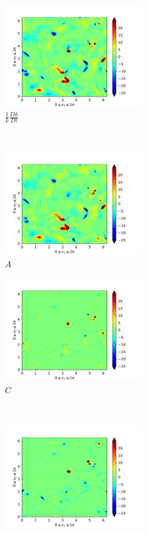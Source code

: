 \begin{figure}[H]
    \begin{subfigure}[H]{0.45\textwidth}
        \includegraphics[height=1.75in]{media/run-cds-65/ke-1360}
        \caption{$\frac{1}{k} \frac{D k}{Dt}$}
    \end{subfigure}
    ~
    \begin{subfigure}{0.45\textwidth}
        \includegraphics[height=1.75in]{media/run-cds-65/A-ke-1360}
        \caption{$A$}
    \end{subfigure}
    \newline
    \begin{subfigure}{0.45\textwidth}
        \includegraphics[height=1.75in]{media/run-cds-65/C-ke-1360}
        \caption{$C$}
    \end{subfigure}
    ~
    \begin{subfigure}{0.45\textwidth}
        \includegraphics[height=1.75in]{media/run-cds-65/P-ke-1360}

\end{subfigure}
\end{figure}

